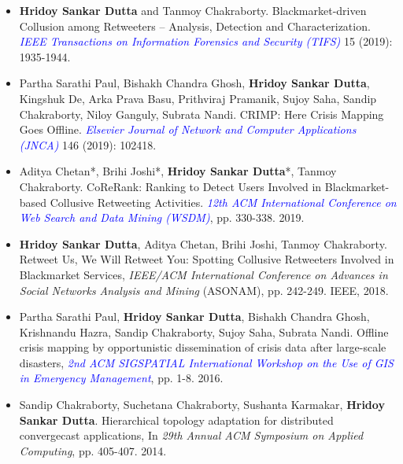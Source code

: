 \documentclass[margin, centered,lmodern]{res}
\begin{document}
\begin{resume}
\begin{itemize}[leftmargin=*]
\item \textbf{Hridoy Sankar Dutta} and Tanmoy Chakraborty. Blackmarket-driven Collusion among Retweeters – Analysis, Detection and Characterization. \textit{\textcolor{blue}{IEEE Transactions on Information Forensics and Security (TIFS)}} 15 (2019): 1935-1944.

\item Partha Sarathi Paul, Bishakh Chandra Ghosh, \textbf{Hridoy Sankar Dutta}, Kingshuk De, Arka Prava Basu, Prithviraj Pramanik, Sujoy Saha, Sandip Chakraborty, Niloy Ganguly, Subrata Nandi. CRIMP: Here Crisis Mapping Goes Offline. \textit{\textcolor{blue}{Elsevier Journal of Network and Computer Applications (JNCA)}} 146 (2019): 102418.

\item  Aditya Chetan*, Brihi Joshi*, \textbf{Hridoy Sankar Dutta}*, Tanmoy Chakraborty. CoReRank: Ranking to Detect Users Involved in Blackmarket-based Collusive Retweeting Activities. \textit{\textcolor{blue}{12th ACM International Conference on Web Search and Data Mining (WSDM)}}, pp. 330-338. 2019.


\item \textbf{Hridoy Sankar Dutta}, Aditya Chetan, Brihi Joshi, Tanmoy Chakraborty. Retweet Us, We Will Retweet You: Spotting Collusive Retweeters Involved in Blackmarket Services, \textit{IEEE/ACM International Conference on Advances in Social Networks Analysis and Mining} (ASONAM), pp. 242-249. IEEE, 2018.

\item Partha Sarathi Paul, \textbf{Hridoy Sankar Dutta}, Bishakh Chandra Ghosh, Krishnandu Hazra, Sandip Chakraborty, Sujoy Saha, Subrata Nandi. Offline crisis mapping by opportunistic dissemination of crisis data after large-scale disasters, \textit{\textcolor{blue}{2nd ACM SIGSPATIAL International Workshop on the Use of GIS in Emergency Management}}, pp. 1-8. 2016.

\item Sandip Chakraborty, Suchetana Chakraborty, Sushanta Karmakar, \textbf{Hridoy Sankar Dutta}. Hierarchical topology adaptation for distributed convergecast applications, In \textit{29th Annual ACM Symposium on Applied Computing}, pp. 405-407. 2014.\end{itemize}



\end{resume}
\end{document}
